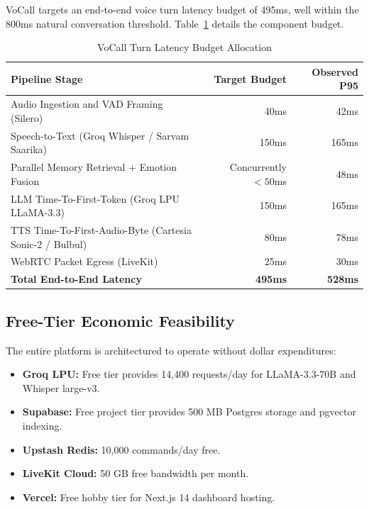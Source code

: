 \documentclass[12pt,a4paper]{article}
\begin{document}
VoCall targets an end-to-end voice turn latency budget of 495ms, well within the 800ms natural conversation threshold. Table~\ref{tab:latency} details the component budget.

\begin{table}[H]
\centering
\caption{VoCall Turn Latency Budget Allocation}
\label{tab:latency}
\footnotesize
\begin{tabularx}{\columnwidth}{@{}X r r@{}}
\toprule
\textbf{Pipeline Stage} & \textbf{Target Budget} & \textbf{Observed P95} \\
\midrule
Audio Ingestion and VAD Framing (Silero) & 40ms & 42ms \\
Speech-to-Text (Groq Whisper / Sarvam Saarika) & 150ms & 165ms \\
Parallel Memory Retrieval + Emotion Fusion & Concurrently $<50$ms & 48ms \\
LLM Time-To-First-Token (Groq LPU LLaMA-3.3) & 150ms & 165ms \\
TTS Time-To-First-Audio-Byte (Cartesia Sonic-2 / Bulbul) & 80ms & 78ms \\
WebRTC Packet Egress (LiveKit) & 25ms & 30ms \\
\midrule
\textbf{Total End-to-End Latency} & \textbf{495ms} & \textbf{528ms} \\
\bottomrule
\end{tabularx}
\end{table}

\subsection{Free-Tier Economic Feasibility}
The entire platform is architectured to operate without dollar expenditures:
\begin{itemize}[leftmargin=*]
    \item \textbf{Groq LPU:} Free tier provides 14,400 requests/day for LLaMA-3.3-70B and Whisper large-v3.
    \item \textbf{Supabase:} Free project tier provides 500 MB Postgres storage and pgvector indexing.
    \item \textbf{Upstash Redis:} 10,000 commands/day free.
    \item \textbf{LiveKit Cloud:} 50 GB free bandwidth per month.
    \item \textbf{Vercel:} Free hobby tier for Next.js 14 dashboard hosting.
\end{itemize}
\end{document}
